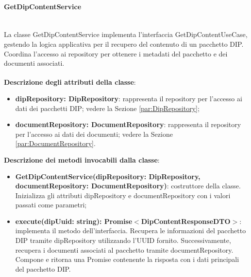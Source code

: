 \documentclass[a4paper,12pt]{article}
\begin{document}
{{{                \paragraph{GetDipContentService}\label{par:GetDipContentService}\mbox{}\\
                La classe GetDipContentService implementa l'interfaccia GetDipContentUseCase, gestendo la logica applicativa per il recupero del contenuto di un pacchetto DIP. Coordina l'accesso ai repository per ottenere i metadati del pacchetto e dei documenti associati.\\
                \\
                \textbf{Descrizione degli attributi della classe}:
                \begin{itemize}
                    \item \textbf{dipRepository: DipRepository}: rappresenta il repository per l'accesso ai dati dei pacchetti DIP; vedere la Sezione \ref{par:DipRepository};
                    \item \textbf{documentRepository: DocumentRepository}: rappresenta il repository per l'accesso ai dati dei documenti; vedere la Sezione \ref{par:DocumentRepository}.
                \end{itemize}
                
              \noindent \textbf{Descrizione dei metodi invocabili dalla classe}:
                \begin{itemize}
                    \item \textbf{GetDipContentService(dipRepository: DipRepository, documentRepository: DocumentRepository)}: costruttore della classe. Inizializza gli attributi dipRepository e documentRepository con i valori passati come parametri;
                    \item \textbf{execute(dipUuid: string): Promise$<$DipContentResponseDTO$>$}: implementa il metodo dell'interfaccia. Recupera le informazioni del pacchetto DIP tramite dipRepository utilizzando l'UUID fornito. Successivamente, recupera i documenti associati al pacchetto tramite documentRepository. Compone e ritorna una Promise contenente la risposta con i dati principali del pacchetto DIP.
                \end{itemize}
}}}
\end{document}
